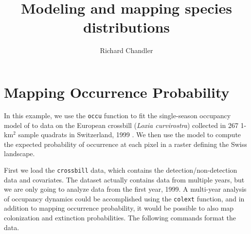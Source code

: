 \documentclass[a4paper]{article}
\title{Modeling and mapping species distributions}
\author{Richard Chandler}
\begin{document}
\maketitle





\section*{Mapping Occurrence Probability}



In this example, we use the \verb+occu+ function to fit the
single-season occupancy model of
\citep{mackenzie_estimating_2002} to data on the European crossbill
(\emph{Loxia curvirostra}) collected in 267 1-km$^2$ sample
quadrats in Switzerland, 1999 \citep{schmid_etal:2004}.
We then use the model to compute the expected probability of
occurrence at each pixel in a raster defining the Swiss
landscape.

First we load the \verb+crossbill+ data, which contains the
detection/non-detection data and covariates. The dataset actually
contains data from multiple years, but we are only going to analyze
data from the first year, 1999. A multi-year analysis of occupancy
dynamics could be accomplished using the \verb+colext+ function, and
in addition to mapping occurrence probability, it would be possible to
also map colonization and extinction probabilities. The following
commands format the data.
\end{document}
